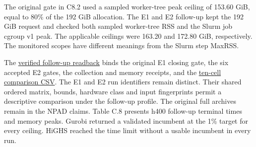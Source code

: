 \documentclass[
  english,
  11pt,
  a4paper,
]{article}
\begin{document}
The original gate in C8.2 used a sampled worker-tree peak ceiling of
153.60 GiB, equal to 80\% of the 192 GiB allocation. The E1 and E2
follow-up kept the 192 GiB request and checked both sampled worker-tree
RSS and the Slurm job cgroup v1 peak. The applicable ceilings were
163.20 and 172.80 GiB, respectively. The monitored scopes have different
meanings from the Slurm step MaxRSS.

The
\href{https://github.com/unb-lamfo-or-ai-hpc/model-agrologistic/blob/docs/editorial-reconciliation-20261105/docs/evidence/h400_e1_e2_final_20261112/verification.json}{verified
follow-up readback} binds the original E1 closing gate, the six accepted
E2 gates, the collection and memory receipts, and the
\href{https://github.com/unb-lamfo-or-ai-hpc/model-agrologistic/blob/docs/editorial-reconciliation-20261105/docs/evidence/h400_e1_e2_final_20261112/h400-e1-e2.csv}{ten-cell
comparison CSV}. The E1 and E2 run identifiers remain distinct. Their
shared ordered matrix, bounds, hardware class and input fingerprints
permit a descriptive comparison under the follow-up profile. The
original full archives remain in the NPAD claims. Table C.8 presents h400 follow-up terminal times and memory peaks.
Gurobi returned a validated incumbent at the 1\% target for every ceiling. HiGHS reached the time limit without a usable incumbent in every run.
\end{document}

